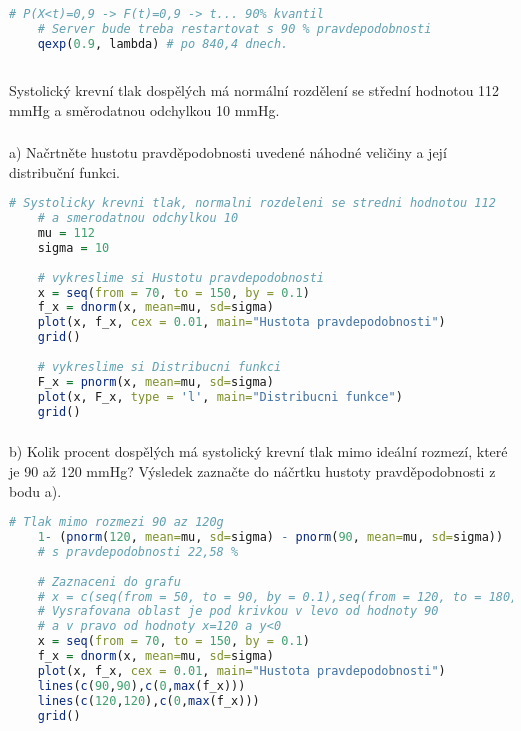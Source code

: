 \documentclass{article}%
\begin{document}
\begin{lstlisting}[language=R, showstringspaces=false, basicstyle=\small]
    # P(X<t)=0,9 -> F(t)=0,9 -> t... 90% kvantil
    # Server bude treba restartovat s 90 % pravdepodobnosti
    qexp(0.9, lambda) # po 840,4 dnech.    
\end{lstlisting}


\newpage
\subsection{}
Systolický krevní tlak dospělých má normální rozdělení se střední hodnotou 112 mmHg a směrodatnou odchylkou 10 mmHg.

\subsubsection{}
a) Načrtněte hustotu pravděpodobnosti uvedené náhodné veličiny a její distribuční funkci.

\begin{lstlisting}[language=R, showstringspaces=false, basicstyle=\small]
    # Systolicky krevni tlak, normalni rozdeleni se stredni hodnotou 112 
    # a smerodatnou odchylkou 10
    mu = 112
    sigma = 10
    
    # vykreslime si Hustotu pravdepodobnosti
    x = seq(from = 70, to = 150, by = 0.1)
    f_x = dnorm(x, mean=mu, sd=sigma)
    plot(x, f_x, cex = 0.01, main="Hustota pravdepodobnosti")
    grid()
    
    # vykreslime si Distribucni funkci
    F_x = pnorm(x, mean=mu, sd=sigma)
    plot(x, F_x, type = 'l', main="Distribucni funkce")
    grid()
\end{lstlisting}

\subsubsection{}
b) Kolik procent dospělých má systolický krevní tlak mimo ideální rozmezí, které je 90 až 120 mmHg? Výsledek zaznačte do náčrtku hustoty pravděpodobnosti z bodu a).

\begin{lstlisting}[language=R, showstringspaces=false, basicstyle=\small]
    # Tlak mimo rozmezi 90 az 120g
    1- (pnorm(120, mean=mu, sd=sigma) - pnorm(90, mean=mu, sd=sigma)) 
    # s pravdepodobnosti 22,58 %
    
    # Zaznaceni do grafu
    # x = c(seq(from = 50, to = 90, by = 0.1),seq(from = 120, to = 180, by = 0.1))
    # Vysrafovana oblast je pod krivkou v levo od hodnoty 90 
    # a v pravo od hodnoty x=120 a y<0
    x = seq(from = 70, to = 150, by = 0.1)
    f_x = dnorm(x, mean=mu, sd=sigma)
    plot(x, f_x, cex = 0.01, main="Hustota pravdepodobnosti")
    lines(c(90,90),c(0,max(f_x)))
    lines(c(120,120),c(0,max(f_x)))
    grid()
\end{lstlisting}
\end{document}
